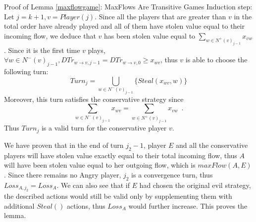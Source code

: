 \begin{sepproof}{Proof of Lemma \ref{maxflowgame}: MaxFlows Are Transitive Games}
   Induction step: Let $j = k + 1, v = Player\left(j\right)$. Since all the players that are greater than $v$ in the
   total order have already played and all of them have stolen value equal to their incoming flow, we deduce that $v$ has
   been stolen value equal to $\sum\limits_{w \in N^{+}\left(v\right)_{j-1}}x_{vw}$. Since it is the first time $v$
   plays, $\forall w \in N^{-}\left(v\right)_{j-1}, DTr_{w \rightarrow v, j-1} = DTr_{w \rightarrow v, 0} \geq x_{wv}$, thus
   $v$ is able to choose the following turn:
   \begin{equation*}
      Turn_j = \bigcup\limits_{w \in N^{-}\left(v\right)_{j-1}}\{Steal\left(x_{wv}, w\right)\}
   \end{equation*}
   Moreover, this turn satisfies the conservative strategy since
   \begin{equation*}
      \sum\limits_{w \in N^{-}\left(v\right)_{j-1}}x_{wv} = \sum\limits_{w \in N^{+}\left(v\right)_{j-1}}x_{vw} \enspace.
   \end{equation*}
   Thus $Turn_j$ is a valid turn for the conservative player $v$.

   We have proven that in the end of turn $j_2 - 1$, player $E$ and all the conservative players will have stolen value
   exactly equal to their total incoming flow, thus $A$ will have been stolen value equal to her outgoing flow, which is
   $maxFlow(A, E)$. Since there remains no Angry player, $j_2$ is a convergence turn, thus $Loss_{A, j_2} = Loss_A$. We
   can also see that if $E$ had chosen the original evil strategy, the described actions would still be valid only by
   supplementing them with additional $Steal\left(\right)$ actions, thus $Loss_A$ would further increase. This proves the
   lemma.
\end{sepproof}
